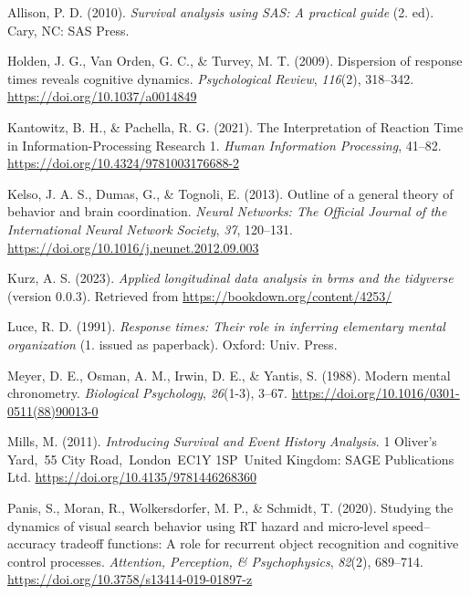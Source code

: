 \documentclass[
  man,floatsintext]{apa6}
\newlength{\cslhangindent}
\newenvironment{CSLReferences}[2] %
 {\begin{list}{}{%
  \setlength{\itemindent}{0pt}
  \setlength{\leftmargin}{0pt}
  \setlength{\parsep}{0pt}
  \ifodd #1
   \setlength{\leftmargin}{\cslhangindent}
   \setlength{\itemindent}{-1\cslhangindent}
  \fi
  \setlength{\itemsep}{#2\baselineskip}}}
 {\end{list}}
\begin{document}
\label{refs}
\begin{CSLReferences}{1}{0}
Allison, P. D. (2010). \emph{Survival analysis using {SAS}: A practical guide} (2. ed). Cary, NC: SAS Press.

Holden, J. G., Van Orden, G. C., \& Turvey, M. T. (2009). Dispersion of response times reveals cognitive dynamics. \emph{Psychological Review}, \emph{116}(2), 318--342. \url{https://doi.org/10.1037/a0014849}

Kantowitz, B. H., \& Pachella, R. G. (2021). The {Interpretation} of {Reaction Time} in {Information-Processing Research} 1. \emph{Human Information Processing}, 41--82. \url{https://doi.org/10.4324/9781003176688-2}

Kelso, J. A. S., Dumas, G., \& Tognoli, E. (2013). Outline of a general theory of behavior and brain coordination. \emph{Neural Networks: The Official Journal of the International Neural Network Society}, \emph{37}, 120--131. \url{https://doi.org/10.1016/j.neunet.2012.09.003}

Kurz, A. S. (2023). \emph{Applied longitudinal data analysis in brms and the tidyverse} (version 0.0.3). Retrieved from \url{https://bookdown.org/content/4253/}

Luce, R. D. (1991). \emph{Response times: Their role in inferring elementary mental organization} (1. issued as paperback). Oxford: Univ. Press.

Meyer, D. E., Osman, A. M., Irwin, D. E., \& Yantis, S. (1988). Modern mental chronometry. \emph{Biological Psychology}, \emph{26}(1-3), 3--67. \url{https://doi.org/10.1016/0301-0511(88)90013-0}

Mills, M. (2011). \emph{Introducing {Survival} and {Event History Analysis}}. 1 Oliver's Yard,~55 City Road,~London~EC1Y 1SP~United Kingdom: SAGE Publications Ltd. \url{https://doi.org/10.4135/9781446268360}

Panis, S., Moran, R., Wolkersdorfer, M. P., \& Schmidt, T. (2020). Studying the dynamics of visual search behavior using {RT} hazard and micro-level speed--accuracy tradeoff functions: {A} role for recurrent object recognition and cognitive control processes. \emph{Attention, Perception, \& Psychophysics}, \emph{82}(2), 689--714. \url{https://doi.org/10.3758/s13414-019-01897-z}


\end{CSLReferences}
\end{document}
